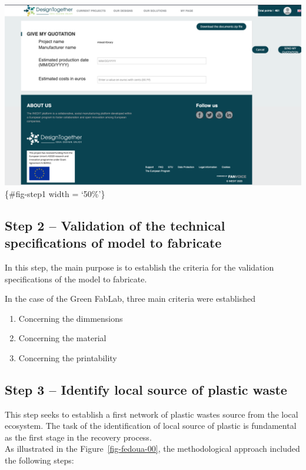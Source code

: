 \documentclass[
  11pt,
]{article}
\providecommand{\tightlist}{%
  \setlength{\itemsep}{0pt}\setlength{\parskip}{0pt}}\usepackage{longtable,booktabs,array}
\begin{document}
\includegraphics{figures/Step-1.png}\{\#fig-step1 width = `50\%'\}

\hypertarget{step-2-validation-of-the-technical-specifications-of-model-to-fabricate}{%
\subsection{Step 2 -- Validation of the technical specifications of
model to
fabricate}\label{step-2-validation-of-the-technical-specifications-of-model-to-fabricate}}

In this step, the main purpose is to establish the criteria for the
validation specifications of the model to fabricate.

In the case of the Green FabLab, three main criteria were established

\begin{enumerate}
\def\labelenumi{\arabic{enumi}.}
\tightlist
\item
  Concerning the dimmensions
\item
  Concerning the material
\item
  Concerning the printability
\end{enumerate}

\hypertarget{step-3-identify-local-source-of-plastic-waste}{%
\subsection{Step 3 -- Identify local source of plastic
waste}\label{step-3-identify-local-source-of-plastic-waste}}

This step seeks to establish a first network of plastic wastes source
from the local ecosystem. The task of the identification of local source
of plastic is fundamental as the first stage in the recovery process.\\
As illustrated in the Figure~\ref{fig-fedoua-00}, the methodological
approach included the following steps:
\end{document}
